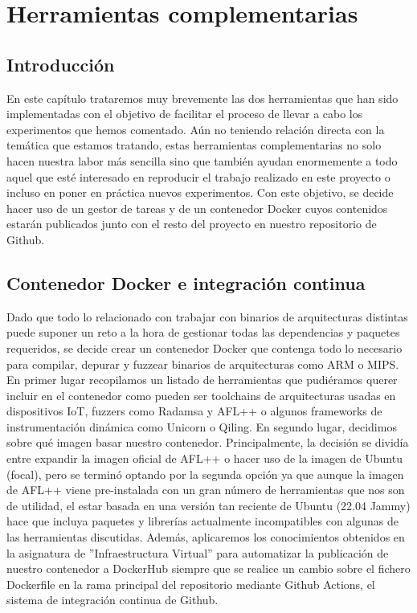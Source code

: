 \chapter{Herramientas complementarias}
\label{herramientas}
\section{Introducción}
En este capítulo trataremos muy brevemente las dos herramientas que han sido implementadas con el objetivo de facilitar el proceso de llevar a cabo los 
experimentos que hemos comentado. Aún no teniendo relación directa con la temática que estamos tratando, estas herramientas complementarias no solo 
hacen nuestra labor más sencilla sino que también ayudan enormemente a todo aquel que esté interesado en reproducir el trabajo realizado en este proyecto
o incluso en poner en práctica nuevos experimentos. Con este objetivo, se decide hacer uso de un gestor de tareas y de un contenedor Docker cuyos contenidos estarán
publicados junto con el resto del proyecto en nuestro repositorio de Github.

\section{Contenedor Docker e integración continua}
Dado que todo lo relacionado con trabajar con binarios de arquitecturas distintas puede suponer un reto a la hora de gestionar todas las dependencias
y paquetes requeridos, se decide crear un contenedor Docker que contenga todo lo necesario para compilar, depurar y fuzzear binarios de arquitecturas como 
ARM o MIPS. En primer lugar recopilamos un listado de herramientas que pudiéramos querer incluir en el contenedor como pueden ser toolchains de arquitecturas
usadas en dispositivos IoT, 
fuzzers como Radamsa y AFL++ o algunos frameworks de instrumentación dinámica como Unicorn o Qiling. En segundo lugar, decidimos sobre qué
imagen basar nuestro contenedor. Principalmente, la decisión se dividía entre expandir la imagen oficial de AFL++ o hacer uso de la imagen de Ubuntu (focal), pero se 
terminó optando por la segunda opción ya que aunque la imagen de AFL++ viene pre-instalada con un gran número de herramientas que nos son de utilidad, el 
estar basada en una versión tan reciente de Ubuntu (22.04 Jammy) hace que incluya paquetes y librerías actualmente incompatibles con algunas de las 
herramientas discutidas. Además, aplicaremos los conocimientos obtenidos en la asignatura de ''Infraestructura Virtual'' para automatizar la publicación de nuestro
contenedor a DockerHub siempre que se realice un cambio sobre el fichero Dockerfile en la rama principal del repositorio mediante Github Actions,
el sistema de integración continua de Github.

